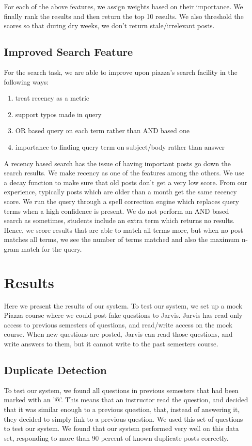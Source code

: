 \documentclass[sigconf]{acmart}
\begin{document}
For each of the above features, we assign weights based on their importance. We finally rank the results and then return the top 10 results. We also threshold the scores so that during dry weeks, we don't return stale/irrelevant posts.

\subsection{Improved Search Feature}
For the search task, we are able to improve upon piazza's search facility in the following ways:
\begin{enumerate}
\item treat recency as a metric
\item support typos made in query
\item OR based query on each term rather than AND based one
\item importance to finding query term on subject/body rather than answer
\end{enumerate}

A recency based search has the issue of having important posts go down the search results. We make recency as one of the features among the others. We use a decay function to make sure that old posts don't get a very low score. From our experience, typically posts which are older than a month get the same recency score. We run the query through a spell correction engine which replaces query terms when a high confidence is present. We do not perform an AND based search as sometimes, students include an extra term which returns no results. Hence, we score results that are able to match all terms more, but when no post matches all terms, we see the number of terms matched and also the maximum n-gram match for the query. 

\section{Results}
Here we present the results of our system.
To test our system, we set up a mock Piazza course where we could post fake questions to Jarvis. Jarvis has read only access to previous semesters of questions, and read/write access on the mock course. When new questions are posted, Jarvis can read those questions, and write answers to them, but it cannot write to the past semesters course.

\subsection{Duplicate Detection}
To test our system, we found all questions in previous semesters that had been marked with an '@'. This means that an instructor read the question, and decided that it was similar enough to a previous question, that, instead of answering it, they decided to simply link to a previous question. We used this set of questions to test our system. We found that our system performed very well on this data set, responding to more than 90 percent of known duplicate posts correctly.
\end{document}
